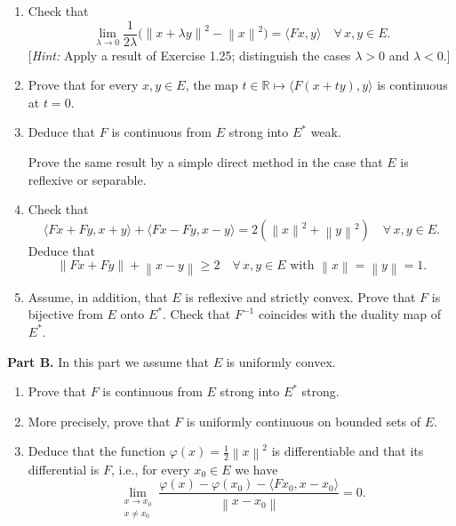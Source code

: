 \documentclass[12pt]{article}
\newcommand{\norm}[1]{\left\|#1\right\|}
\newcommand{\ip}[2]{\langle #1, #2 \rangle}
\newcommand{\R}{\mathbb{R}}
\begin{document}
\begin{enumerate}
\item Check that
\[
\lim_{\lambda \to 0} \frac{1}{2\lambda}\bigl(\norm{x + \lambda y}^2 - \norm{x}^2\bigr) = \ip{Fx}{y}
\quad \forall\, x, y \in E.
\]
[\textit{Hint:} Apply a result of Exercise 1.25; distinguish the cases $\lambda > 0$ and $\lambda < 0$.]

\item Prove that for every $x, y \in E$, the map $t \in \R \mapsto \ip{F(x+ty)}{y}$ is continuous at $t = 0$.

\noindent[\textit{Hint:} Use the inequality $\tfrac{1}{2}(\norm{v}^2 - \norm{u}^2) \ge \ip{Fu}{v-u}$ with $u = x + ty$ and $v = x + \lambda y$.]

\item Deduce that $F$ is continuous from $E$ strong into $E^*$ weak.


Prove the same result by a simple direct method in the case that $E$ is reflexive or separable.

\item Check that
\[
\ip{Fx + Fy}{x+y} + \ip{Fx - Fy}{x-y} = 2(\norm{x}^2 + \norm{y}^2) \quad \forall\, x, y \in E.
\]
Deduce that
\[
\norm{Fx + Fy} + \norm{x-y} \ge 2 \quad \forall\, x, y \in E \text{ with } \norm{x} = \norm{y} = 1.
\]

\item Assume, in addition, that $E$ is reflexive and strictly convex. Prove that $F$ is bijective
from $E$ onto $E^*$. Check that $F^{-1}$ coincides with the duality map of $E^*$.
\end{enumerate}

\noindent\textbf{Part B.} In this part we assume that $E$ is uniformly convex.

\begin{enumerate}
\item Prove that $F$ is continuous from $E$ strong into $E^*$ strong.

\item More precisely, prove that $F$ is uniformly continuous on bounded sets of $E$.


\item Deduce that the function $\varphi(x) = \tfrac{1}{2}\norm{x}^2$ is differentiable and that its differential
is $F$, i.e., for every $x_0 \in E$ we have
\[
\lim_{\substack{x \to x_0 \\ x \neq x_0}}
\frac{\varphi(x) - \varphi(x_0) - \ip{Fx_0}{x - x_0}}{\norm{x - x_0}} = 0.
\]
\end{enumerate}
\end{document}
